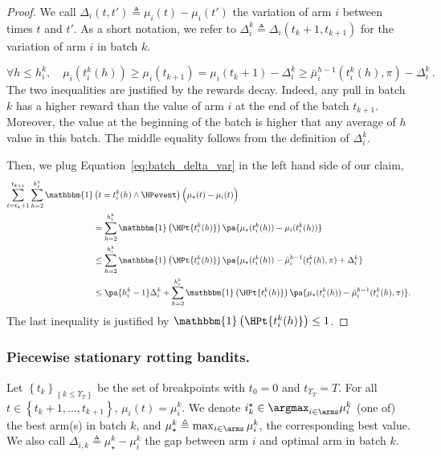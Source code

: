 \begin{proof}
We call $\Delta_{i}(t,t')\triangleq \mu_i(t) - \mu_i(t')$ the variation of arm $i$ between times $t$ and $t'$.
As a short notation, we refer to $\Delta_i^k \triangleq \Delta_{i}(t_k+1,t_{k+1})$ for the variation of arm $i$ in batch $k$.

\begin{equation}
\label{eq:batch_delta_var}
    \forall h\leq h_i^k, \quad \mu_i( t_i^k(h)) \geq \mu_i(t_{k+1}) =  \mu_i(t_k +1 ) - \Delta_i^k \geq \bar{\mu}_i^{h-1}( t_i^k(h), \pi) - \Delta_i^k\,.
\end{equation} 
The two inequalities are justified by the rewards decay. Indeed, any pull in batch $k$ has a higher reward than the value of arm $i$ at the end of the batch $t_{k+1}$. Moreover, the value at the beginning of the batch is higher that any average of $h$ value in this batch. The middle equality follows from the definition of $\Delta_i^k$.

Then, we plug Equation~\ref{eq:batch_delta_var} in the left hand side of our claim,
\begin{align*}
\sum_{t=t_{k} +1 }^{t_{k+1}}
\sum_{h=2}^{h^k_{i}}\mathbbm{1}&\left(t = t_i^k(h) \land \HPevent\right)\Big(  \mu_{\star}(t) - \mu_{i}(t) \Big) \\
& = \sum_{h=2}^{h^k_{i}}\mathbbm{1}\left(\HPt{t_i^k(h)}\right)\pa{  \mu_{\star}(t_i^k(h)) - \mu_{i}(t_i^k(h))} \\
&\leq \sum_{h=2}^{h^k_{i}}\mathbbm{1}\left(\HPt{t_i^k(h)}\right)\pa{  \mu_{\star}(t_i^k(h)) - \bar{\mu}_i^{h-1}( t_i^k(h),\pi) + \Delta_i^k}\\
&\leq  \pa{h_i^k-1}\Delta_i^k + \sum_{h=2}^{h^k_{i}}\mathbbm{1}\left(\HPt{t_i^k(h)}\right)\pa{  \mu_{\star}(t_i^k(h)) - \bar{\mu}_i^{h-1}(t_i^k(h),\pi)} .
\end{align*}
The last inequality is justified by $\mathbbm{1}\left(\HPt{t_i^k(h)}\right)\leq 1$.
\end{proof}

\subsubsection*{Piecewise stationary rotting bandits.}
\sloppy
Let $\left\{t_k\right\}_{\left\{k \leq \Upsilon_T\right\}}$ be the set of breakpoints with $t_0=0$ and $t_{\Upsilon_T} = T$. For all $t \in \left\{t_k\! +\!1 , \dots , t_{k\!+\!1}\right\}$, $\mu_i(t) = \mu_i^k$. We denote $i^\star_k \in \argmax_{i\in \arms} \mu_i^k$ (one of) the best arm(s) in batch $k$, and $\mu_{\star}^k \triangleq \max_{i\in \arms} \mu_i^k$, the corresponding best value. We also call $\Delta_{i,k} \triangleq \mu_{\star}^k - \mu_i^k$ the gap between arm $i$ and optimal arm in batch $k$.

